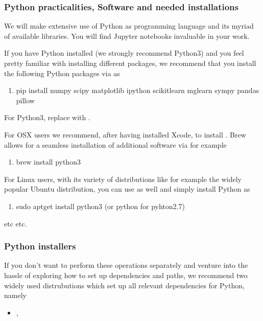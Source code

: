 \documentclass[letterpaper,10pt,english]{sphinxmanual}
\begin{document}
\subsubsection{Python practicalities, Software and needed installations}
\label{\detokenize{chapter2:python-practicalities-software-and-needed-installations}}
We will make extensive use of Python as programming language and its
myriad of available libraries.  You will find
Jupyter notebooks invaluable in your work.

If you have Python installed (we strongly recommend Python3) and you feel
pretty familiar with installing different packages, we recommend that
you install the following Python packages via  as
\begin{enumerate}
%
\item {} 
pip install numpy scipy matplotlib ipython scikit\sphinxhyphen{}learn mglearn sympy pandas pillow

\end{enumerate}

For Python3, replace  with .

For OSX users we recommend, after having installed Xcode, to
install . Brew allows for a seamless installation of additional
software via for example
\begin{enumerate}
%
\item {} 
brew install python3

\end{enumerate}

For Linux users, with its variety of distributions like for example the widely popular Ubuntu distribution,
you can use  as well and simply install Python as
\begin{enumerate}
%
\item {} 
sudo apt\sphinxhyphen{}get install python3  (or python for pyhton2.7)

\end{enumerate}

etc etc.


\subsubsection{Python installers}
\label{\detokenize{chapter2:python-installers}}
If you don’t want to perform these operations separately and venture
into the hassle of exploring how to set up dependencies and paths, we
recommend two widely used distrubutions which set up all relevant
dependencies for Python, namely
\begin{itemize}
\item {} 
,

\end{itemize}
\end{document}
